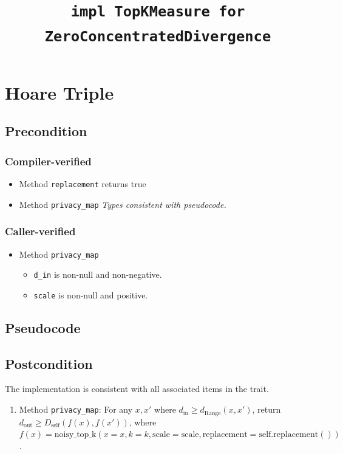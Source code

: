 \documentclass{article}
\title{\texttt{impl TopKMeasure for ZeroConcentratedDivergence}}
\author{\MichaelShoemateAuthor}
\begin{document}
\maketitle

\section{Hoare Triple}
\subsection*{Precondition}
\subsubsection*{Compiler-verified}
\begin{itemize}
    \item Method \texttt{replacement} returns true
    \item Method \texttt{privacy\_map}
        \textit{Types consistent with pseudocode.}
\end{itemize}

\subsubsection*{Caller-verified}
\begin{itemize}
    \item Method \texttt{privacy\_map}
        \begin{itemize}
            \item \texttt{d\_in} is non-null and non-negative.
            \item \texttt{scale} is non-null and positive.
        \end{itemize}
\end{itemize}

\subsection*{Pseudocode}
\label{sec:python-pseudocode}


\subsection*{Postcondition}
\begin{theorem}
    The implementation is consistent with all associated items in the  trait.
    \begin{enumerate}
        \item Method \texttt{privacy\_map}:
        For any $x, x'$ where $d_\mathrm{in} \ge d_\mathrm{Range}(x, x')$,
        return $d_\mathrm{out} \ge D_\mathrm{self}(f(x), f(x'))$,
        where $f(x) = \mathrm{noisy\_top\_k}(x=x, k=k, \mathrm{scale}=\mathrm{scale}, \mathrm{replacement}=\mathrm{self.replacement()})$.
    \end{enumerate}
\end{theorem}
\end{document}
